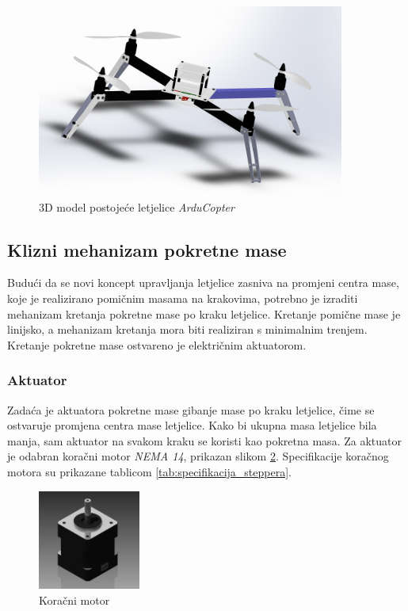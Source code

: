 \documentclass[11pt,a4paper]{article}
\begin{document}
\begin{figure}[H]
	\centering
	\includegraphics[width=0.9\textwidth]{figures/arducopter_original.png}
	\caption{3D model postojeće letjelice \textit{ArduCopter}}
	\label{fig:3D_drone_original}
\end{figure}

\subsection{Klizni mehanizam pokretne mase}

Budući da se novi koncept upravljanja letjelice zasniva na promjeni centra mase, koje je realizirano pomičnim masama na krakovima, potrebno je izraditi mehanizam kretanja pokretne mase po kraku letjelice. Kretanje pomične mase je linijsko, a mehanizam kretanja mora biti realiziran s minimalnim trenjem. Kretanje pokretne mase ostvareno je električnim aktuatorom.

\subsubsection{Aktuator}
Zadaća je aktuatora pokretne mase gibanje mase po kraku letjelice, čime se ostvaruje promjena centra mase letjelice. Kako bi ukupna masa letjelice bila manja, sam aktuator na svakom kraku se koristi kao pokretna masa. Za aktuator je odabran koračni motor \textit{NEMA 14}, prikazan slikom \ref{fig:stepper_motor}. Specifikacije koračnog motora su prikazane tablicom \ref{tab:specifikacija_steppera}.

\begin{figure}[H]
	\centering
	\includegraphics[width=0.3\textwidth]{figures/StepperMotor.jpg}
	\caption{Koračni motor}
	\label{fig:stepper_motor}
\end{figure}
\end{document}
